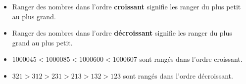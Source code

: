\begin{defi*}{}{}
\begin{itemize}[label=$-$]
	\item Ranger des nombres dans l'ordre {\bf croissant} signifie les ranger du plus petit au plus grand.
	\item Ranger des nombres dans l'ordre {\bf décroissant} signifie les ranger du plus grand au plus petit.
\end{itemize}
\end{defi*}

\begin{exemple*}{}{}
\begin{itemize}[label=$-$]
	\item $\num{1000045}<\num{1000085}<\num{1000600}<\num{1000607}$ sont rangés dans l'ordre croissant.
	\item $321>312>231>213>132>123$ sont rangés dans l'ordre décroissant.
	\end{itemize}
\end{exemple*}